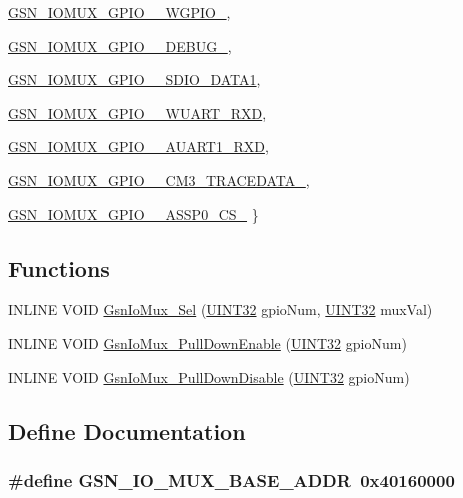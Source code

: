 \begin{DoxyCompactItemize}
\hyperlink{a00519_a7ddef78d187dcfeb85d9e19b4d2bd5acac846537a0770496cd2c2c43138edcbc8}{GSN\_\-IOMUX\_\-GPIO\_\_\-WGPIO\_}, 
\par
\hyperlink{a00519_a7ddef78d187dcfeb85d9e19b4d2bd5aca1051059ca6a55bdb098bd0ed4a4db9b2}{GSN\_\-IOMUX\_\-GPIO\_\_\-DEBUG\_}, 
\par
\hyperlink{a00519_a7ddef78d187dcfeb85d9e19b4d2bd5aca71e232974b6306eed33789b9a2a0db7b}{GSN\_\-IOMUX\_\-GPIO\_\_\-SDIO\_\-DATA1}, 
\par
\hyperlink{a00519_a7ddef78d187dcfeb85d9e19b4d2bd5aca4dbd906ed6ec48b34a46fbff43a8fa92}{GSN\_\-IOMUX\_\-GPIO\_\_\-WUART\_\-RXD}, 
\par
\hyperlink{a00519_a7ddef78d187dcfeb85d9e19b4d2bd5aca02e48aca093999fbd592c1b90723f509}{GSN\_\-IOMUX\_\-GPIO\_\_\-AUART1\_\-RXD}, 
\par
\hyperlink{a00519_a7ddef78d187dcfeb85d9e19b4d2bd5acac3c079a15d8795174e2ec9f79c1cbcb6}{GSN\_\-IOMUX\_\-GPIO\_\_\-CM3\_\-TRACEDATA\_}, 
\par
\hyperlink{a00519_a7ddef78d187dcfeb85d9e19b4d2bd5acaa7e6ec26fc00297b4f2c57ac8190e530}{GSN\_\-IOMUX\_\-GPIO\_\_\-ASSP0\_\-CS\_}
 \}
\end{DoxyCompactItemize}
\subsection*{Functions}
\begin{DoxyCompactItemize}
\item 
INLINE VOID \hyperlink{a00519_abc8edf7e43806de30917865fbe12c390}{GsnIoMux\_\-Sel} (\hyperlink{a00660_gae1e6edbbc26d6fbc71a90190d0266018}{UINT32} gpioNum, \hyperlink{a00660_gae1e6edbbc26d6fbc71a90190d0266018}{UINT32} muxVal)
\item 
INLINE VOID \hyperlink{a00519_a8e3d29c0bfdfd0cf5c3d30516ad00752}{GsnIoMux\_\-PullDownEnable} (\hyperlink{a00660_gae1e6edbbc26d6fbc71a90190d0266018}{UINT32} gpioNum)
\item 
INLINE VOID \hyperlink{a00519_a61ba143bd47e5c096cddb2eff1c247d9}{GsnIoMux\_\-PullDownDisable} (\hyperlink{a00660_gae1e6edbbc26d6fbc71a90190d0266018}{UINT32} gpioNum)
\end{DoxyCompactItemize}


\subsection{Define Documentation}
\hypertarget{a00519_aa8695a3975db7fcc40f4259bd0c6fc2a}{
\subsubsection[{GSN\_\-IO\_\-MUX\_\-BASE\_\-ADDR}]{\setlength{\rightskip}{0pt plus 5cm}\#define GSN\_\-IO\_\-MUX\_\-BASE\_\-ADDR~0x40160000}}
\label{a00519_aa8695a3975db7fcc40f4259bd0c6fc2a}


